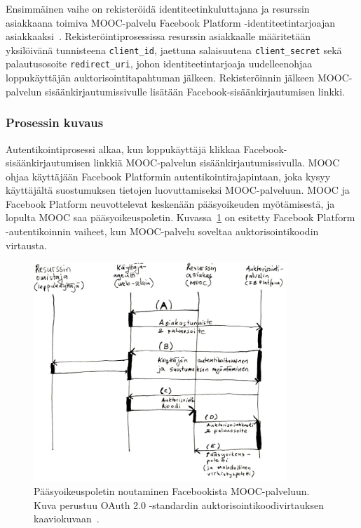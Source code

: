 \documentclass[finnish,gradu]{tktltiki}
\begin{document}
  Ensimmäinen vaihe on rekisteröidä identiteetinkuluttajana ja resurssin asiakkaana toimiva MOOC-palvelu Facebook Platform -identiteetintarjoajan asiakkaaksi~\cite{facebook_oauth2_doc}. Rekisteröintiprosessissa resurssin asiakkaalle määritetään yksilöivänä tunnisteena \verb!client_id!, jaettuna salaisuutena \verb!client_secret! sekä palautusosoite \verb!redirect_uri!, johon identiteetintarjoaja uudelleenohjaa loppukäyttäjän auktorisointitapahtuman jälkeen. Rekisteröinnin jälkeen MOOC-palvelun sisäänkirjautumissivulle lisätään Facebook-sisäänkirjautumisen linkki.


  \subsubsection{Prosessin kuvaus} %
  \label{ssub:autentikoinnin_vaiheet_facebook_platform_palveluun}

  Autentikointiprosessi alkaa, kun loppukäyttäjä klikkaa Facebook-sisäänkirjautumisen linkkiä MOOC-palvelun sisäänkirjautumissivulla. MOOC ohjaa käyttäjään Facebook Platformin autentikointirajapintaan, joka kysyy käyttäjältä suostumuksen tietojen luovuttamiseksi MOOC-palveluun. MOOC ja Facebook Platform neuvottelevat keskenään pääsyoikeuden myötämisestä, ja lopulta MOOC saa pääsyoikeuspoletin. Kuvassa~\ref{fig:oauth_auth_code_flow} on esitetty Facebook Platform -autentikoinnin vaiheet, kun MOOC-palvelu soveltaa auktorisointikoodin virtausta.

  \begin{figure}[h!]
    \centering
    \includegraphics[width=0.85\textwidth]{images/fb_auth_sekvenssi.jpg}
    \caption{Pääsyoikeuspoletin noutaminen Facebookista MOOC-palveluun. Kuva perustuu OAuth 2.0 -standardin auktorisointikoodivirtauksen kaaviokuvaan~\cite{ietf_oauth2}.}
    \label{fig:oauth_auth_code_flow}
  \end{figure}
\end{document}
